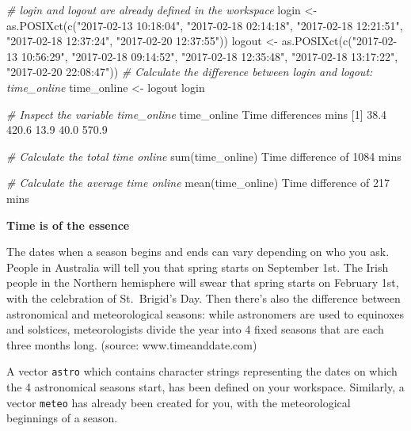 \documentclass[]{article}
\newcommand{\hlnum}[1]{\textcolor[rgb]{0.816,0.125,0.439}{#1}}%
\newcommand{\hlstr}[1]{\textcolor[rgb]{0.251,0.627,0.251}{#1}}%
\newcommand{\hlcom}[1]{\textcolor[rgb]{0.502,0.502,0.502}{\textit{#1}}}%
\newcommand{\hlstd}[1]{\textcolor[rgb]{0.251,0.251,0.251}{#1}}%
\newcommand{\hlkwd}[1]{\textcolor[rgb]{0.878,0.439,0.125}{#1}}%
\newenvironment{Shaded}{\begin{myshaded}}{\end{myshaded}}
\newcommand{\KeywordTok}[1]{\hlkwd{#1}}
\newcommand{\DecValTok}[1]{\hlnum{#1}}
\newcommand{\FloatTok}[1]{\hlnum{#1}}
\newcommand{\StringTok}[1]{\hlstr{#1}}
\newcommand{\CommentTok}[1]{\hlcom{#1}}
\newcommand{\NormalTok}[1]{\hlstd{#1}}
\begin{document}
\begin{Shaded}
\begin{Highlighting}[]
\CommentTok{# login and logout are already defined in the workspace}
\NormalTok{login <-}\KeywordTok{as.POSIXct}\NormalTok{(}\KeywordTok{c}\NormalTok{(}\StringTok{"2017-02-13 10:18:04"}\NormalTok{, }\StringTok{"2017-02-18 02:14:18"}\NormalTok{, }
\StringTok{"2017-02-18 12:21:51"}\NormalTok{, }\StringTok{"2017-02-18 12:37:24"}\NormalTok{,}
\StringTok{"2017-02-20 12:37:55"}\NormalTok{))}
\NormalTok{logout <-}\StringTok{ }\KeywordTok{as.POSIXct}\NormalTok{(}\KeywordTok{c}\NormalTok{(}\StringTok{"2017-02-13 10:56:29"}\NormalTok{, }\StringTok{"2017-02-18 09:14:52"}\NormalTok{, }\StringTok{"2017-02-18 12:35:48"}\NormalTok{,}
\StringTok{"2017-02-18 13:17:22"}\NormalTok{, }\StringTok{"2017-02-20 22:08:47"}\NormalTok{))}
\CommentTok{# Calculate the difference between login and logout: time_online}
\NormalTok{time_online <-}\StringTok{ }\NormalTok{logout }\OperatorTok{-}\StringTok{ }\NormalTok{login}

\CommentTok{# Inspect the variable time_online}
\NormalTok{time_online}
\NormalTok{   Time differences }\NormalTok{ mins}
\NormalTok{   [}\DecValTok{1}\NormalTok{]  }\FloatTok{38.4} \FloatTok{420.6}  \FloatTok{13.9}  \FloatTok{40.0} \FloatTok{570.9}

\CommentTok{# Calculate the total time online}
\KeywordTok{sum}\NormalTok{(time_online)}
\NormalTok{   Time difference of }\DecValTok{1084}\NormalTok{ mins}

\CommentTok{# Calculate the average time online}
\KeywordTok{mean}\NormalTok{(time_online)}
\NormalTok{   Time difference of }\DecValTok{217}\NormalTok{ mins}
\end{Highlighting}
\end{Shaded}

\textbf{Time is of the essence}

The dates when a season begins and ends can vary depending on who you
ask. People in Australia will tell you that spring starts on September
1st. The Irish people in the Northern hemisphere will swear that spring
starts on February 1st, with the celebration of St.~Brigid's Day. Then
there's also the difference between astronomical and meteorological
seasons: while astronomers are used to equinoxes and solstices,
meteorologists divide the year into 4 fixed seasons that are each three
months long. (source: www.timeanddate.com)

A vector \texttt{astro} which contains character strings representing
the dates on which the 4 astronomical seasons start, has been defined on
your workspace. Similarly, a vector \texttt{meteo} has already been
created for you, with the meteorological beginnings of a season.
\end{document}
